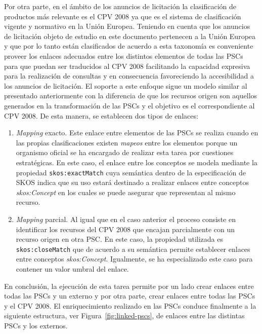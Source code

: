 Por otra parte, en el ámbito de los anuncios de licitación la clasificación de productos más relevante es el \gls{CPV} 2008 ya que 
es el sistema de clasificación vigente y normativo en la Unión Europea. Teniendo en cuenta que los anuncios de licitación 
objeto de estudio en este documento pertenecen a la Unión Europea y que por lo tanto están clasificados de acuerdo a esta 
taxonomía es conveniente proveer los enlaces adecuados entre los distintos elementos de todas las PSCs para que puedan 
ser traducidos al CPV 2008 facilitando la capacidad expresiva para la realización de consultas y en consecuencia favoreciendo 
la accesibilidad a los anuncios de licitación. El soporte a este enfoque sigue un modelo similar al presentado anteriormente 
con la diferencia de que los recursos origen son aquellos generados en la transformación de las \gls{PSC}s y el \dataset objetivo 
es el correspondiente al CPV 2008. De esta manera, se establecen dos tipos de enlaces:
\begin{enumerate}
 \item \textit{Mapping} exacto. Este enlace entre elementos de las PSCs se realiza cuando en las propias clasificaciones existen 
\textit{mapeos} entre los elementos porque un organismo oficial se ha encargado de realizar esta tarea por cuestiones estratégicas. En este caso, 
el enlace entre los conceptos se modela mediante la propiedad \texttt{skos:exactMatch} cuya semántica dentro de la especificación 
de SKOS indica que su uso estará destinado a realizar enlaces entre conceptos \textit{skos:Concept} en los cuales se puede asegurar 
que representan al mismo recurso.
\item \textit{Mapping} parcial. Al igual que en el caso anterior el proceso consiste en identificar los recursos del CPV 2008 que encajan 
parcialmente con un recurso origen en otra PSC. En este caso, la propiedad utilizada es \texttt{skos:closeMatch} que de acuerdo 
a su semántica permite establecer enlaces entre conceptos \textit{skos:Concept}. Igualmente, se ha especializado este caso 
para contener un valor umbral del enlace.
\end{enumerate}
 
En conclusión, la ejecución de esta tarea permite por un lado crear enlaces entre todas las PSCs y un \dataset externo y por otra parte, 
crear enlaces entre todas las PSCs y el CPV 2008. El enriquecimiento realizado en las PSCs conduce finalmente a la siguiente estructura, 
ver Figura~\ref{fig:linked-pscs}, de enlaces entre las distintas PSCs y los \datasets externos.

